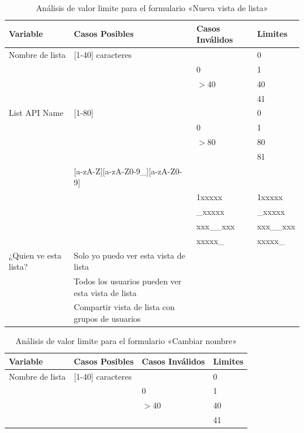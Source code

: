 \begin{table}
\centering
\begin{tabular}{|p{3.0cm}|p{7.0cm}|p{3.0cm}|l|}
\hline
\footnotesize{\textbf{Variable}} & \footnotesize{\textbf{Casos Posibles}} & \footnotesize{\textbf{Casos Inválidos}} & \footnotesize{\textbf{Limites}} \\
\hline
\footnotesize{Nombre de lista} & \footnotesize{[1-40] caracteres} & & \footnotesize{0} \\
& & \footnotesize{0} & \footnotesize{1} \\
& & \footnotesize{$>$40} & \footnotesize{40} \\
& & & \footnotesize{41} \\
\hline
\footnotesize{List API Name} & \footnotesize{[1-80]} & & \footnotesize{0} \\
& & \footnotesize{0} & \footnotesize{1} \\
& & \footnotesize{$>$80} & \footnotesize{80} \\
& & & \footnotesize{81} \\
& \footnotesize{[a-zA-Z][a-zA-Z0-9\_][a-zA-Z0-9]} & & \\
& & \footnotesize{1xxxxx} & \footnotesize{1xxxxx} \\
& & \footnotesize{\_xxxxx} & \footnotesize{\_xxxxx} \\
& & \footnotesize{xxx\_\_xxx} & \footnotesize{xxx\_\_xxx} \\
& & \footnotesize{xxxxx\_} & \footnotesize{xxxxx\_} \\
\hline
\footnotesize{¿Quien ve esta lista?} & \footnotesize{Solo yo puedo ver esta vista de lista} & & \\
& \footnotesize{Todos los usuarios pueden ver esta vista de lista} & & \\
& \footnotesize{Compartir vista de lista con grupos de usuarios} & & \\
\hline
\end{tabular}
\caption{Análisis de valor limite para el formulario «Nueva vista de lista»}
\label{myers_07}
\end{table}

\begin{table}
\centering
\begin{tabular}{|l|l|l|l|}
\hline
\footnotesize{\textbf{Variable}} & \footnotesize{\textbf{Casos Posibles}} & \footnotesize{\textbf{Casos Inválidos}} & \footnotesize{\textbf{Limites}} \\
\hline
\footnotesize{Nombre de lista} & \footnotesize{[1-40] caracteres} & & \footnotesize{0} \\
& & \footnotesize{0} & \footnotesize{1} \\
& & \footnotesize{$>$40} & \footnotesize{40} \\
& & & \footnotesize{41} \\
\hline
\end{tabular}
\caption{Análisis de valor limite para el formulario «Cambiar nombre»}
\label{myers_08}
\end{table}

